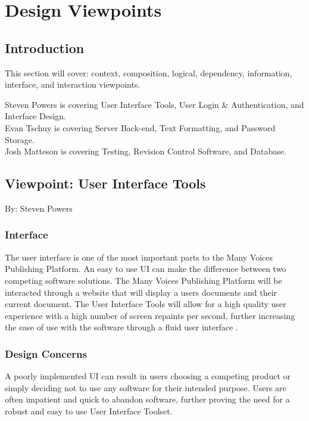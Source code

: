 \documentclass[onecolumn, draftclsnofoot,10pt, compsoc]{IEEEtran}
\begin{document}
\clearpage
\section{Design Viewpoints}

\subsection{Introduction}
\noindent This section will cover: context, composition, logical, dependency, information, interface, and interaction viewpoints. 

\noindent Steven Powers is covering User Interface Tools, 
User Login \& Authentication, and Interface Design.  \\
\noindent Evan Tschuy is covering Server Back-end, Text Formatting, 
and Password Storage. \\
\noindent Josh Matteson is covering Testing, Revision Control Software, 
and Database. \\



\subsection{Viewpoint: User Interface Tools}
{\noindent By: Steven Powers \par}

\subsubsection{Interface}
\noindent The user interface is one of the most important parts to the Many
Voices Publishing Platform. An easy to use UI can make the difference between
two competing software solutions. The Many Voices Publishing Platform will be
interacted through a website that will display a users documents and their 
current document. The User Interface Tools will allow for a high quality user 
experience with a high number of screen repaints per second, further 
increasing the ease of use with the software through a fluid user interface 
\cite{Eisenberg}. \\

\subsubsection{Design Concerns}
\noindent A poorly implemented UI can result in users choosing a competing
product or simply deciding not to use any software for their intended purpose.
Users are often impatient and quick to abandon software, further proving the 
need for a robust and easy to use User Interface Toolset.  \\
\end{document}
